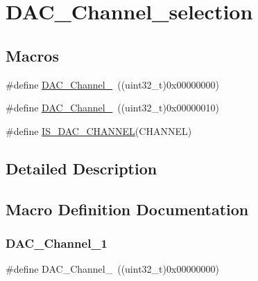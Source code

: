 \hypertarget{group___d_a_c___channel__selection}{}\section{D\+A\+C\+\_\+\+Channel\+\_\+selection}
\label{group___d_a_c___channel__selection}
\subsection*{Macros}
\begin{DoxyCompactItemize}
\item 
\#define \mbox{\hyperlink{group___d_a_c___channel__selection_gacf6585474ed2a302b69a3725daa91555}{D\+A\+C\+\_\+\+Channel\+\_}}~((uint32\+\_\+t)0x00000000)
\item 
\#define \mbox{\hyperlink{group___d_a_c___channel__selection_ga0e9b0096866bb06e8a82b3e4e66943bb}{D\+A\+C\+\_\+\+Channel\+\_}}~((uint32\+\_\+t)0x00000010)
\item 
\#define \mbox{\hyperlink{group___d_a_c___channel__selection_gafb2b9bdaccb3a5e3396925d7cba02cc3}{I\+S\+\_\+\+D\+A\+C\+\_\+\+C\+H\+A\+N\+N\+EL}}(C\+H\+A\+N\+N\+EL)
\end{DoxyCompactItemize}


\subsection{Detailed Description}


\subsection{Macro Definition Documentation}
\mbox{\label{group___d_a_c___channel__selection_gacf6585474ed2a302b69a3725daa91555}} 
\subsubsection{\texorpdfstring{DAC\_Channel\_1}{DAC\_Channel\_1}}
{\footnotesize\ttfamily \#define D\+A\+C\+\_\+\+Channel\+\_~((uint32\+\_\+t)0x00000000)}

\mbox{\label{group___d_a_c___channel__selection_ga0e9b0096866bb06e8a82b3e4e66943bb}} 
